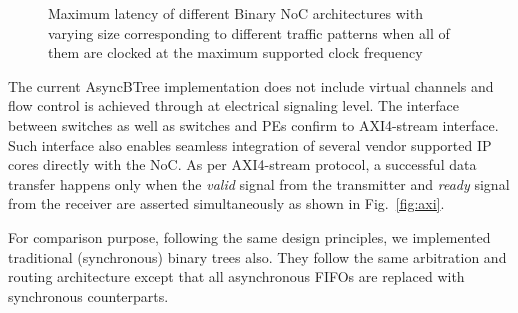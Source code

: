 \begin{figure}[t]
\centering     %
{}
\caption{Maximum latency of different Binary NoC architectures with varying size corresponding to different traffic patterns when all of them 
are clocked at the maximum supported clock frequency}
\label{fig:latmax}
\end{figure}


The current AsyncBTree implementation does not include virtual channels and flow control is achieved through at electrical signaling level.
The interface between switches as well as switches and PEs confirm to AXI4-stream interface.
Such interface also enables seamless integration of several vendor supported IP cores directly with the NoC.
As per AXI4-stream protocol, a successful data transfer happens only when the \emph{valid} signal from the transmitter and \emph{ready} signal from the receiver are asserted simultaneously as shown in Fig.~\ref{fig:axi}.

For comparison purpose, following the same design principles, we implemented traditional (synchronous) binary trees also.
They follow the same arbitration and routing architecture except that all asynchronous FIFOs are replaced with synchronous counterparts.